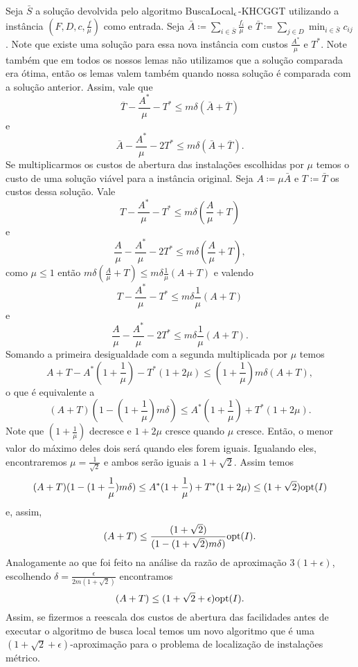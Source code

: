 Seja $\bar{S}$ a solução devolvida pelo algoritmo {\sc BuscaLocal$_\epsilon$-KHCGGT} utilizando a instância $(F,D,c,\frac{f}{\mu})$ como entrada. Seja $\bar{A} \coloneqq \sum_{i \in \bar{S}} \frac{f_i}{\mu}$ e $\bar{T} \coloneqq \sum_{j\in D} \min_{i \in \bar{S}} c_{ij}$. Note que existe uma solução para essa nova instância com custos $\frac{A^*}{\mu}$ e $T^*$. Note também que em todos os nossos lemas não utilizamos  que a solução comparada era ótima, então os lemas valem também quando nossa solução é comparada com a solução anterior. Assim, vale que
\[ \overline{T} - \frac{A^*}{\mu} - T^* \leq m\delta(\bar{A} + \overline{T})\]
e
\[ \bar{A} - \frac{A^*}{\mu} - 2T^* \leq m\delta(\bar{A} + \overline{T}).\]
Se multiplicarmos os custos de abertura das instalações escolhidas por $\mu$ temos o custo de uma solução viável para a instância original. Seja $A \coloneqq \mu\bar{A}$ e $T \coloneqq \bar{T}$ os custos dessa solução. Vale
\[ T - \frac{A^*}{\mu} - T^* \leq m\delta(\frac{A}{\mu}+ T)\]
e
\[ \frac{A}{\mu} - \frac{A^*}{\mu} - 2T^* \leq m\delta(\frac{A}{\mu} + T),\]
como $\mu \leq 1$ então $m\delta(\frac{A}{\mu}+ T) \leq m\delta\frac{1}{\mu}( A + T)$ e valendo 
\[T - \frac{A^*}{\mu} - T^* \leq m\delta\frac{1}{\mu}( A + T) \] 
e 
\[ \frac{A}{\mu} - \frac{A^*}{\mu} - 2T^* \leq m\delta\frac{1}{\mu}( A + T) .\]
Somando a primeira desigualdade com a segunda multiplicada por $\mu$ temos
\[A + T - A^* (1 + \frac{1}{\mu}) - T^*(1 + 2\mu) \leq (1 + \frac{1}{\mu})m\delta(A+T),\]
o que é equivalente a 
\[(A+T)(1 - (1+\frac{1}{\mu})m\delta)\leq A^* (1 + \frac{1}{\mu}) + T^*(1 + 2\mu).\]
Note que $(1+\frac{1}{\mu})$ decresce e $1 + 2\mu$ cresce quando $\mu$ cresce. Então, o menor valor do máximo deles dois será quando eles forem iguais. Igualando eles, encontraremos $\mu = \frac{1}{\sqrt{2}}$ e ambos serão iguais a $1 + \sqrt{2}$. Assim temos
\[(A+T)(1 - (1+\frac{1}{\mu})m\delta)\leq A^* (1 + \frac{1}{\mu}) + T^*(1 + 2\mu) \leq (1+\sqrt{2})\mathrm{opt}(I)\]
e, assim, 
\[(A+T)\leq \frac{(1+\sqrt{2})}{(1 - (1+\sqrt{2 })m\delta)}\mathrm{opt}(I).\]
Analogamente ao que foi feito na análise da razão de aproximação $3(1 + \epsilon)$, escolhendo $\delta = \frac{\epsilon}{2m(1+\sqrt{2})}$ encontramos 
\[(A+T) \leq (1 + \sqrt{2} + \epsilon )\mathrm{opt}(I).\]
Assim, se fizermos a reescala dos custos de abertura das facilidades antes de executar o algoritmo de busca local temos um novo algoritmo que é uma $(1 + \sqrt{2} + \epsilon )$-aproximação para o problema de localização de instalações métrico.